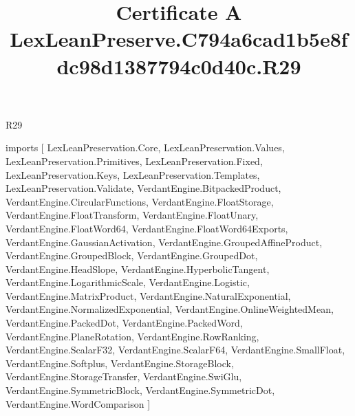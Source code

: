 \begin{lexlean}{R29}
\title{Certificate A LexLeanPreserve.C794a6cad1b5e8fdc98d1387794c0d40c.R29}
\begin{coremodule}
imports [
  LexLeanPreservation.Core,
  LexLeanPreservation.Values,
  LexLeanPreservation.Primitives,
  LexLeanPreservation.Fixed,
  LexLeanPreservation.Keys,
  LexLeanPreservation.Templates,
  LexLeanPreservation.Validate,
  VerdantEngine.BitpackedProduct,
  VerdantEngine.CircularFunctions,
  VerdantEngine.FloatStorage,
  VerdantEngine.FloatTransform,
  VerdantEngine.FloatUnary,
  VerdantEngine.FloatWord64,
  VerdantEngine.FloatWord64Exports,
  VerdantEngine.GaussianActivation,
  VerdantEngine.GroupedAffineProduct,
  VerdantEngine.GroupedBlock,
  VerdantEngine.GroupedDot,
  VerdantEngine.HeadSlope,
  VerdantEngine.HyperbolicTangent,
  VerdantEngine.LogarithmicScale,
  VerdantEngine.Logistic,
  VerdantEngine.MatrixProduct,
  VerdantEngine.NaturalExponential,
  VerdantEngine.NormalizedExponential,
  VerdantEngine.OnlineWeightedMean,
  VerdantEngine.PackedDot,
  VerdantEngine.PackedWord,
  VerdantEngine.PlaneRotation,
  VerdantEngine.RowRanking,
  VerdantEngine.ScalarF32,
  VerdantEngine.ScalarF64,
  VerdantEngine.SmallFloat,
  VerdantEngine.Softplus,
  VerdantEngine.StorageBlock,
  VerdantEngine.StorageTransfer,
  VerdantEngine.SwiGlu,
  VerdantEngine.SymmetricBlock,
  VerdantEngine.SymmetricDot,
  VerdantEngine.WordComparison
]


\end{coremodule}
\end{lexlean}
